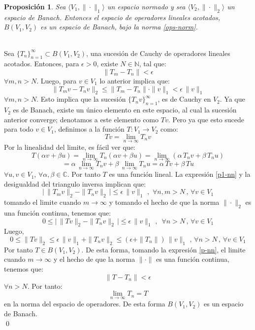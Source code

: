 \documentclass[12pt]{book}
\numberwithin{equation}{chapter}
\newtheorem{proposition}[theorem]{Proposici\'on}
\def\n{\noindent}
\def\C{\mathbb{C}}
\def\la{\langle}
\def\ra{\rangle}
\def\rar{\rightarrow}
\begin{document}
\begin{proposition}
Sea $\la V_{1},\| \cdot \|_{1} \ra$ un espacio normado y sea $\la V_{2},\| \cdot \|_{2} \ra$ un espacio de Banach. Entonces el espacio de operadores lineales acotados, $B(V_{1},V_{2})$ es un espacio de Banach, bajo la norma \eqref{ops-norm}.
\end{proposition}
\n {\bf Demostraci\'on}\\
Sea $\{ T_{n} \}_{n=1}^{\infty} \subset B(V_{1},V_{2})$, una sucesi\'on de Cauchy de operadores lineales acotados. Entonces, para $\epsilon >0$, existe $N \in \mathbb{N}$, tal que:
\begin{equation}\label{p-nn}
\| T_{m}-T_{n} \| < \epsilon
\end{equation}
$\forall m,n > N$. Luego, para $v \in V_{1}$ lo anterior implica que:
\begin{equation}\label{p1-nn}
\| T_{m}v - T_{n}v \|_{2} \leq \| T_{m}-T_{n} \| \cdot \|v\|_{1} < \epsilon \, \|v\|_{1}
\end{equation}
$\forall m,n > N$. Esto implica que la sucesi\'on $\{ T_{n}v \}_{n=1}^{\infty}$, es de Cauchy en $V_{2}$. Ya que $V_{2}$ es de Banach, existe un \'unico elemento en este espacio, al cual la sucesi\'on anterior converge; denotamos a este elemento como $Tv$. Pero ya que esto sucede para todo $v \in V_{1}$, definimos a la funci\'on $T: V_{1} \rar V_{2}$ como:
$$ Tv= \lim_{n \rar \infty} T_{n}v $$
Por la linealidad del limite, es f\'acil ver que:
$$ T(\alpha v + \beta u)= \lim_{n \rar \infty} T_{n}(\alpha v + \beta u) = \lim_{n \rar \infty} \left( \alpha \, T_{n}v + \beta \, T_{n}u \right)$$ 
$$= \alpha \, \lim_{n \rar \infty} T_{n} v + \beta \, \lim_{n \rar \infty} T_{n}u = \alpha \, Tv + \beta \, Tu $$
$ \forall u,v \in V_{1}$, $\forall \alpha , \beta \in \C$. Por tanto $T$ es una funci\'on lineal. La expresi\'on \eqref{p1-nn} y la desigualdad del triangulo inversa implican que:
$$ \Big|\, \|T_{m}v\|_{2} - \|T_{n}v\|_{2}  \,\Big| \leq \epsilon \, \|v\|_{1} \,\,,\,\, \forall n,m > N \,,\, \forall v \in V_{1} $$
tomando el limite cuando $m \rar \infty$ y tomando el hecho de que la norma $ \| \cdot \|_{2} $ es una funci\'on continua, tenemos que:
$$0 \leq \Big|\, \|Tv\|_{2} - \|T_{n}v\|_{2}  \,\Big| \leq \epsilon \, \|v\|_{1} \,\,,\,\,\, \forall n > N \,,\, \forall v \in V_{1} $$
Luego,
$$0 \leq \|Tv\|_{2} \leq \epsilon \, \|v\|_{1} + \|T_{n}v\|_{2} \leq (\epsilon + \|T_{n}\|)\, \|v\|_{1} \,\,,\, \forall n > N \,,\, \forall v \in V_{1} $$
Por tanto $T \in B(V_{1},V_{2})$. De esta forma, tomando la expresi\'on \eqref{p-nn}, el limite cuando $m \rar \infty$ y el hecho de que la norma $\| \cdot \|$ es una funci\'on continua, tenemos que:
$$ \| T - T_{n} \| < \epsilon $$
$\forall n > N$. Por tanto:
$$ \lim_{n \rar \infty} T_{n} = T $$
en la norma del espacio de operadores. De esta forma $B(V_{1},V_{2})$ es un espacio de Banach. \\
\qed
\end{document}
